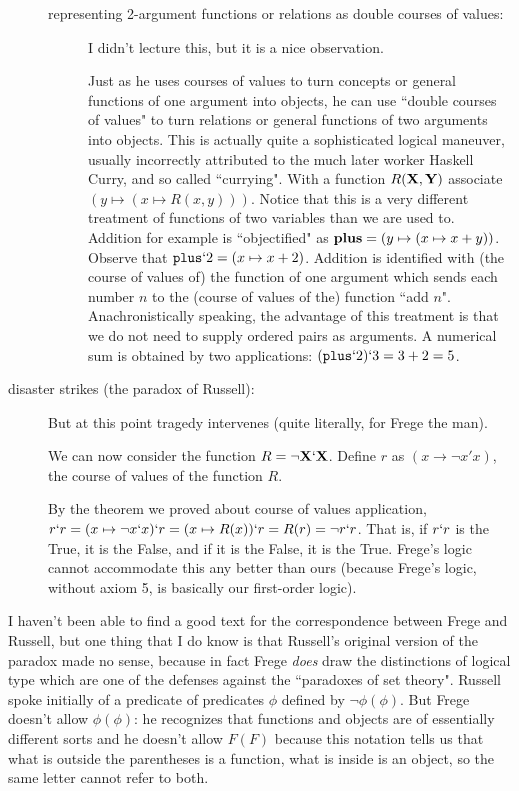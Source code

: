 \documentclass[12pt]{article}
\begin{document}
\begin{description}
\begin{description}
\item[representing 2-argument functions or relations  as double courses of values:] 

I didn't lecture this, but it is a nice observation.

Just as he uses courses of values to turn concepts or general functions of one argument  into objects, he can use ``double courses of values" to turn relations or general functions of two arguments  into objects.  This is actually quite a sophisticated logical maneuver, usually incorrectly attributed to the much later worker Haskell Curry, and so called ``currying".  With a function $R({\bf X},{\bf Y})$ associate $(y \mapsto (x \mapsto R(x,y)))$.
Notice that this is a very different treatment of functions of two variables than we are used to.  Addition for example is ``objectified" as ${\bf plus}=(y \mapsto (x \mapsto x+y))$.
Observe that ${\tt plus}`2 = (x \mapsto x+2)$.  Addition is identified with (the course of values of) the function of one argument which sends each number $n$ to the (course of values of the) function ``add $n$".  Anachronistically speaking, the advantage of this treatment is that we do not need to supply ordered pairs as arguments.  A numerical sum is obtained by two applications:
$({\tt plus}`2)`3 = 3+2 = 5$.

\end{description}



\item[disaster strikes (the paradox of Russell):]  But at this point tragedy intervenes (quite literally, for Frege the man).

We can now consider the function $R= \neg {\bf X}`{\bf X}$.  Define $r$ as $(x \rightarrow \neg x'x)$, the course of values of the function $R$.

By the theorem we proved about course of values application, $r`r = (x \mapsto \neg x`x)`r = (x \mapsto R(x))`r = R(r) = \neg r`r$.  That is, if $r`r$ is the True, it is the False, and if it is the False, it is the True.  Frege's logic cannot accommodate this any better than ours (because Frege's logic, without axiom 5, is basically our first-order logic).

\end{description}

I haven't been able to find a good text for the correspondence between Frege and Russell, but one thing that I do know is that Russell's original version of the paradox made no sense, because in fact Frege {\em does\/} draw the distinctions of logical type which are one of the defenses against the ``paradoxes of set theory".  Russell spoke initially of a predicate of predicates
$\phi$ defined by $\neg \phi(\phi)$.  But Frege doesn't allow $\phi(\phi)$:  he recognizes that functions and objects are of essentially different sorts and he doesn't
allow $F(F)$ because this notation tells us that what is outside the parentheses is a function, what is inside is an object, so the same letter cannot refer to both.
\end{document}
